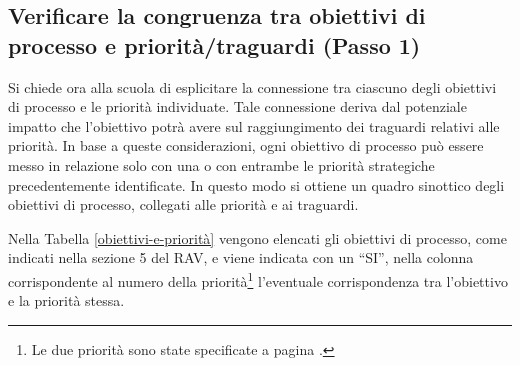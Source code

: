 \documentclass[12pt,a4paper,oneside]{memoir}
\begin{document}
\subsection[Passo 1. Verificare la congruenza]{Verificare la congruenza tra obiettivi di processo e priorità/traguardi (Passo 1)}

Si chiede ora alla scuola di esplicitare la connessione tra ciascuno degli obiettivi di processo e le priorità individuate. Tale connessione deriva dal potenziale impatto che l'obiettivo potrà avere sul raggiungimento dei traguardi relativi alle priorità. In base a queste considerazioni, ogni obiettivo di processo può essere messo in relazione solo con una o con entrambe le priorità strategiche precedentemente identificate. In questo modo si ottiene un quadro sinottico degli obiettivi di processo, collegati alle priorità e ai traguardi.\\


\begin{center}
\end{center}


Nella Tabella \ref{obiettivi-e-priorità} vengono elencati gli obiettivi di processo, come indicati nella sezione 5 del RAV, e viene indicata con un ``SI'', nella colonna corrispondente al numero della priorità\footnote{Le due priorità sono state specificate a pagina \pageref{priorità}.} l'eventuale corrispondenza tra l'obiettivo e la priorità stessa.\\
\end{document}
